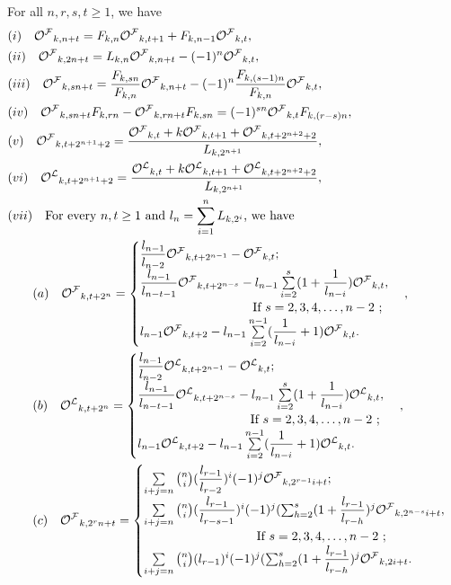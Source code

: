 \begin{theorem}For all $n, r, s, t\geq 1$, we have\label{3.2t}
\begin{align*}
&(i)\quad{{\mathcal{O^F}}}_{k,n+t}={F}_{k,n}{{\mathcal{O^F}}}_{k,t+1}+{F}_{k,n-1}{{\mathcal{O^F}}}_{k,t},\\
&(ii)\quad{{\mathcal{O^F}}}_{k,2n+t}={L}_{k,n}{{\mathcal{O^F}}}_{k,n+t}-(-1)^n{{\mathcal{O^F}}}_{k,t},\\
&(iii)\quad{{\mathcal{O^F}}}_{k,sn+t}=\dfrac{{F}_{k,sn}}{{F}_{k,n}}{{\mathcal{O^F}}}_{k,n+t}-(-1)^n\dfrac{{F}_{k,(s-1)n}}{{F}_{k,n}}{{\mathcal{O^F}}}_{k,t},\\ 
&(iv)\quad{{\mathcal{O^F}}}_{k,sn+t}{F}_{k,rn}-{{\mathcal{O^F}}}_{k,rn+t}{F}_{k,sn}=(-1)^{sn}{{\mathcal{O^F}}}_{k,t}{F}_{k,(r-s)n},\\
&(v)\quad{{\mathcal{O^F}}}_{k,t+2^{n+1}+2}=\dfrac{{{\mathcal{O^F}}}_{k,t}+k{{\mathcal{O^F}}}_{k,t+1}+{{\mathcal{O^F}}}_{k,t+2^{n+2}+2}}{{L}_{k,2^{n+1}}},\\
&(vi)\quad{{\mathcal{O^L}}}_{k,t+2^{n+1}+2}=\dfrac{{{\mathcal{O^L}}}_{k,t}+k{{\mathcal{O^L}}}_{k,t+1}+{{\mathcal{O^L}}}_{k,t+2^{n+2}+2}}{{L}_{k,2^{n+1}}},\\
&(vii) \quad \text{For every $n, t\geq 1$ and $l_n=\sum\limits_{i=1}^n{L}_{k,2^i}$, we have }\\
&\qquad (a)\quad {{\mathcal{O^F}}}_{k,{t+2^n}}= \begin{cases}
 \dfrac{l_{n-1}}{l_{n-2}} {{\mathcal{O^F}}}_{k,t+2^{n-1}}- {{\mathcal{O^F}}}_{k,t};\\
\dfrac{l_{n-1}}{l_{n-t-1}} {{\mathcal{O^F}}}_{k,{t+2^{n-s}}}-l_{n-1}\sum\limits_{i=2}^{s}(1+\dfrac{1}{l_{n-i}}) {{\mathcal{O^F}}}_{k,t},&\\\quad\quad\quad\quad\quad\qquad\qquad   \text{If $s=2, 3, 4,\hdots, n-2 $ };\\l_{n-1} {{\mathcal{O^F}}}_{k,{t+2}}-l_{n-1}\sum\limits_{i=2}^{n-1}(\dfrac{1}{l_{n-i}}+1) {{\mathcal{O^F}}}_{k,t}.
 \end{cases},\\
 &\qquad (b)\quad {{\mathcal{O^L}}}_{k,{t+2^n}}= \begin{cases}
 \dfrac{l_{n-1}}{l_{n-2}} {{\mathcal{O^L}}}_{k,t+2^{n-1}}- {{\mathcal{O^L}}}_{k,t};\\
\dfrac{l_{n-1}}{l_{n-t-1}} {{\mathcal{O^L}}}_{k,{t+2^{n-s}}}-l_{n-1}\sum\limits_{i=2}^{s}(1+\dfrac{1}{l_{n-i}}) {{\mathcal{O^L}}}_{k,t},&\\\quad\quad\quad\quad\quad\quad\quad\qquad \text{If $s=2, 3, 4,\hdots, n-2 $ };\\l_{n-1} {{\mathcal{O^L}}}_{k,{t+2}}-l_{n-1}\sum\limits_{i=2}^{n-1}(\dfrac{1}{l_{n-i}}+1) {{\mathcal{O^L}}}_{k,t}.
 \end{cases},\\
&\qquad (c)\quad  {{\mathcal{O^F}}}_{k,{2^rn+t}}= \begin{cases}
\sum\limits_{i+j=n}\binom{n}{i}(\dfrac{l_{r-1}}{l_{r-2}})^i(-1)^j {{\mathcal{O^F}}}_{k,2^{r-1}i+t};\\
\sum\limits_{i+j=n}\binom{n}{i}(\dfrac{l_{r-1}}{l_{r-s-1}})^i(-1)^j (\sum_{h=2}^s(1+\dfrac{l_{r-1}}{l_{r-h}})^j{{\mathcal{O^F}}}_{k,2^{n-s}i+t}, &\\\quad\quad\quad\quad\quad\qquad\qquad \text{If $s=2, 3, 4,\hdots, n-2 $ };\\\sum\limits_{i+j=n}\binom{n}{i}({l_{r-1}})^i(-1)^j (\sum_{h=2}^s(1+\dfrac{l_{r-1}}{l_{r-h}})^j{{\mathcal{O^F}}}_{k,2i+t}.

\end{cases}
\end{align*}
\end{theorem}
